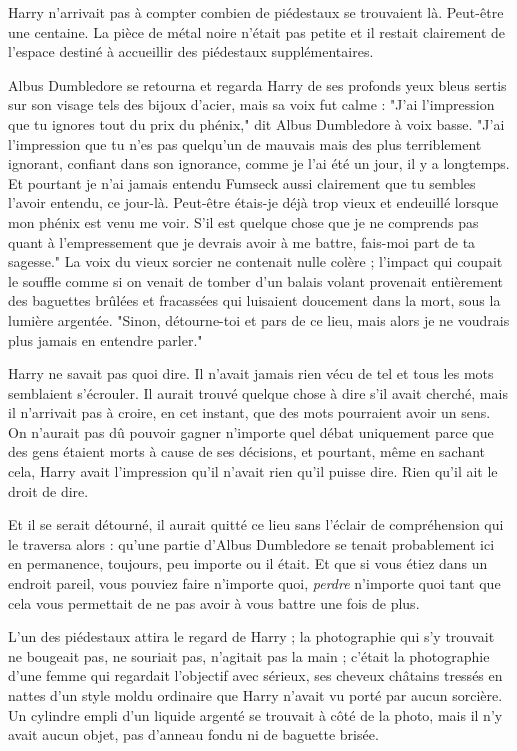 Harry n'arrivait pas à compter combien de piédestaux se trouvaient là. Peut-être une centaine. La pièce de métal noire n'était pas petite et il restait clairement de l'espace destiné à accueillir des piédestaux supplémentaires.

Albus Dumbledore se retourna et regarda Harry de ses profonds yeux bleus sertis sur son visage tels des bijoux d'acier, mais sa voix fut calme : "J'ai l'impression que tu ignores tout du prix du phénix," dit Albus Dumbledore à voix basse. "J'ai l'impression que tu n'es pas quelqu'un de mauvais mais des plus terriblement ignorant, confiant dans son ignorance, comme je l'ai été un jour, il y a longtemps. Et pourtant je n'ai jamais entendu Fumseck aussi clairement que tu sembles l'avoir entendu, ce jour-là. Peut-être étais-je déjà trop vieux et endeuillé lorsque mon phénix est venu me voir. S'il est quelque chose que je ne comprends pas quant à l'empressement que je devrais avoir à me battre, fais-moi part de ta sagesse." La voix du vieux sorcier ne contenait nulle colère ; l'impact qui coupait le souffle comme si on venait de tomber d'un balais volant provenait entièrement des baguettes brûlées et fracassées qui luisaient doucement dans la mort, sous la lumière argentée. "Sinon, détourne-toi et pars de ce lieu, mais alors je ne voudrais plus jamais en entendre parler."

Harry ne savait pas quoi dire. Il n'avait jamais rien vécu de tel et tous les mots semblaient s'écrouler. Il aurait trouvé quelque chose à dire s'il avait cherché, mais il n'arrivait pas à croire, en cet instant, que des mots pourraient avoir un sens. On n'aurait pas dû pouvoir gagner n'importe quel débat uniquement parce que des gens étaient morts à cause de ses décisions, et pourtant, même en sachant cela, Harry avait l'impression qu'il n'avait rien qu'il puisse dire. Rien qu'il ait le droit de dire.

Et il se serait détourné, il aurait quitté ce lieu sans l'éclair de compréhension qui le traversa alors : qu'une partie d'Albus Dumbledore se tenait probablement ici en permanence, toujours, peu importe ou il était. Et que si vous étiez dans un endroit pareil, vous pouviez faire n'importe quoi, \emph{perdre}  n'importe quoi tant que cela vous permettait de ne pas avoir à vous battre une fois de plus.

L'un des piédestaux attira le regard de Harry ; la photographie qui s'y trouvait ne bougeait pas, ne souriait pas, n'agitait pas la main ; c'était la photographie d'une femme qui regardait l'objectif avec sérieux, ses cheveux châtains tressés en nattes d'un style moldu ordinaire que Harry n'avait vu porté par aucun sorcière. Un cylindre empli d'un liquide argenté se trouvait à côté de la photo, mais il n'y avait aucun objet, pas d'anneau fondu ni de baguette brisée.

